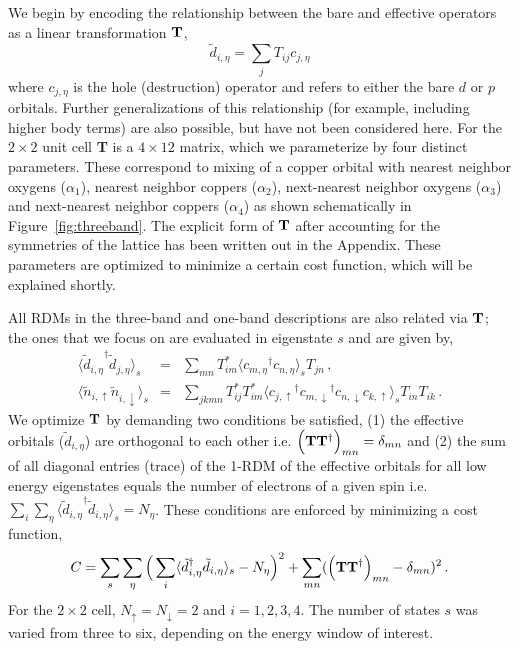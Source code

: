 \documentclass[aps, prb, 11pt]{revtex4-1}
\begin{document}
We begin by encoding the relationship between the bare and effective operators as a linear transformation ${\bf T}$, 
\begin{equation}
	\tilde{d}_{i,\eta} = \sum_{j} T_{ij} c_{j,\eta}
\label{eq:dc}
\end{equation}
where $c_{j,\eta}$ is the hole (destruction) operator and refers to either the bare $d$ or $p$ orbitals. 
Further generalizations of this relationship (for example, including higher body terms) are also possible, but have not been considered here. 
For the $2\times2$ unit cell {\bf T} is a $4 \times 12 $ matrix, which we parameterize by 
four distinct parameters. These correspond to mixing of a copper orbital 
with nearest neighbor oxygens ($\alpha_1$), nearest neighbor coppers ($\alpha_2$), next-nearest neighbor oxygens ($\alpha_3$) 
and next-nearest neighbor coppers ($\alpha_4$) as shown schematically in Figure~\ref{fig:threeband}. 
The explicit form of ${\bf T}$ after accounting for the symmetries of the 
lattice has been written out in the Appendix. These parameters are optimized to minimize a certain cost function, 
which will be explained shortly. 

All RDMs in the three-band and one-band descriptions are also related via ${\bf T}$; 
the ones that we focus on are evaluated in eigenstate $s$ and are given by,
\begin{subequations}
\begin{eqnarray}
	\langle {\tilde{d}_{i,\eta}}^{\dagger} \tilde{d}_{j,\eta} \rangle_{s} &=& \sum_{mn} T^{*}_{im} \langle {c_{m,\eta}}^{\dagger} c_{n,\eta} \rangle_{s} T_{jn} \label{eq:dmstransformations1} \,,\\
	\langle \tilde{n}_{i,\uparrow} \tilde{n}_{i,\downarrow} \rangle_{s} &=& \sum_{jkmn} T^{*}_{ij} T^{*}_{im} \langle {c_{j,\uparrow}}^{\dagger} {c_{m,\downarrow}}^{\dagger} c_{n,\downarrow} c_{k,\uparrow} \rangle_{s} T_{in} T_{ik}\,.
\label{eq:dmstransformations2}
\end{eqnarray}
\end{subequations}
We optimize ${\bf T}$ by demanding two conditions be satisfied, (1) the effective orbitals ($\tilde{d}_{i,\eta}$) 
are orthogonal to each other i.e. $\Big({\bf T} {\bf T}^{\dagger}\Big)_{mn} = \delta_{mn}$
and (2) the sum of all diagonal entries (trace) of the 1-RDM of the effective orbitals for all low energy eigenstates 
equals the number of electrons of a given spin i.e. $\sum_{i} \sum_{\eta} \langle {\tilde{d}_{i,\eta}}^{\dagger} \tilde{d}_{i,\eta} \rangle_{s} = N_{\eta}$. 
These conditions are enforced by minimizing a cost function,
\begin{equation}
C = \sum_{s} \sum_{\eta} \Big( \sum_{i} \langle \tilde{d}_{i,\eta}^{\dagger} \tilde{d}_{i,\eta} \rangle_{s} - N_{\eta} \Big)^{2} + \sum_{mn} ( \Big({\bf T} {\bf T}^{\dagger}\Big)_{mn} -\delta_{mn})^{2}\,.
\label{eq:C}
\end{equation} 
For the $2\times2$ cell, $N_{\uparrow}=N_{\downarrow}=2$ and $i=1,2,3,4$. 
The number of states $s$ was varied from three to six, depending on the energy window of interest.  
\end{document}
